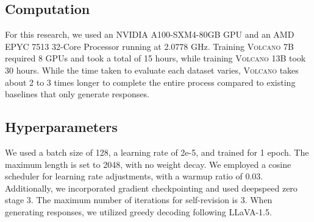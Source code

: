 \documentclass[11pt]{article}
\newcommand{\Ours}{\textsc{Volcano}}
\begin{document}
\subsection{Computation}
For this research, we used an NVIDIA A100-SXM4-80GB GPU and an AMD EPYC 7513 32-Core Processor running at 2.0778 GHz. Training {\Ours} 7B required 8 GPUs and took a total of 15 hours, while training {\Ours} 13B took 30 hours. While the time taken to evaluate each dataset varies, {\Ours} takes about 2 to 3 times longer to complete the entire process compared to existing baselines that only generate responses. \subsection{Hyperparameters}
We used a batch size of 128, a learning rate of 2e-5, and trained for 1 epoch. The maximum length is set to 2048, with no weight decay. We employed a cosine scheduler for learning rate adjustments, with a warmup ratio of 0.03. Additionally, we incorporated gradient checkpointing and used deepspeed zero stage 3. The maximum number of iterations for self-revision is 3. When generating responses, we utilized greedy decoding following LLaVA-1.5.
\end{document}
